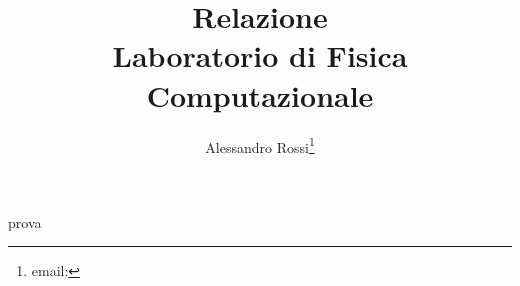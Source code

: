 \documentclass[a4paper]{memoir}
\title{Relazione\\\small Laboratorio di Fisica Computazionale}
\author{Alessandro Rossi\thanks{email:}}
\begin{document}
\maketitle\newpage
prova
\end{document}

